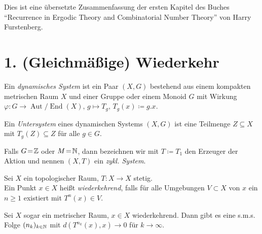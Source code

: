 \documentclass{cheat-sheet}
\DeclareMathOperator{\Aut}{Aut} %
\DeclareMathOperator{\End}{End} %
\newcommand{\AutEnd}{\Aut\!/\!\End} %
\begin{document}


Dies ist eine übersetzte Zusammenfassung der ersten Kapitel des Buches "`Recurrence in Ergodic Theory and Combinatorial Number Theory"' von Harry Furstenberg.


\section{1. (Gleichmäßige) Wiederkehr}


\begin{defn}
  Ein \emph{dynamisches System} ist ein Paar $(X, G)$ bestehend aus einem kompakten metrischen Raum $X$ und einer Gruppe oder einem Monoid $G$ mit Wirkung
  $\varphi : G \to \AutEnd(X), \, g \mapsto T_g, \, T_g(x) \coloneqq g.x$.
\end{defn}

\begin{defn}
  Ein \emph{Untersystem} eines dynamischen Systems $(X, G)$ ist eine Teilmenge $Z \subseteq X$ mit $T_g(Z) \subseteq Z$ für alle $g \in G$.
\end{defn}

\begin{bem}
  Falls $G \!=\! \mathbb{Z}$ oder $M \!=\! \mathbb{N}$, dann bezeichnen wir mit $T \coloneqq T_1$ den Erzeuger der Aktion und nennen $(X, T)$ ein \emph{zykl. System}.
\end{bem}

\begin{defn}
  Sei $X$ ein topologischer Raum, $T : X \to X$ stetig. \\
  Ein Punkt $x \in X$ heißt \emph{wiederkehrend}, falls für alle Umgebungen $V \subset X$ von $x$ ein $n \geq 1$ existiert mit $T^n(x) \in V$.
\end{defn}

\begin{bem}
  Sei $X$ sogar ein metrischer Raum, $x \in X$ wiederkehrend.
  Dann gibt es eine s.m.s. Folge $(n_k)_{k \in \mathbb{N}}$ mit $d(T^{n_k}(x), x) \to 0$ für $k \to \infty$.
\end{bem}
\end{document}
